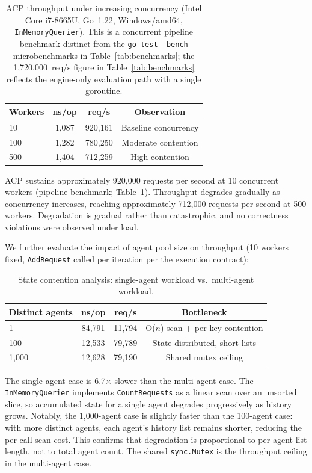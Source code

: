 \documentclass[11pt]{article}
\theoremstyle{definition}
\begin{document}
\begin{table}[h!]
\centering
\small
\begin{tabular}{@{}lccc@{}}
\toprule
\textbf{Workers} & \textbf{ns/op} & \textbf{req/s} & \textbf{Observation} \\
\midrule
10  & 1{,}087 & 920{,}161 & Baseline concurrency \\
100 & 1{,}282 & 780{,}250 & Moderate contention \\
500 & 1{,}404 & 712{,}259 & High contention \\
\bottomrule
\end{tabular}
\caption{ACP throughput under increasing concurrency (Intel Core i7-8665U, Go~1.22, Windows/amd64,
\texttt{InMemoryQuerier}). This is a concurrent pipeline benchmark distinct from the
\texttt{go test -bench} microbenchmarks in Table~\ref{tab:benchmarks}; the 1{,}720{,}000~req/s
figure in Table~\ref{tab:benchmarks} reflects the engine-only evaluation path with a single goroutine.}
\label{tab:throughput}
\end{table}

ACP sustains approximately 920{,}000 requests per second at 10 concurrent workers
(pipeline benchmark; Table~\ref{tab:throughput}).
Throughput degrades gradually as concurrency increases, reaching approximately
712{,}000 requests per second at 500 workers.
Degradation is gradual rather than catastrophic, and no correctness violations were observed under load.

We further evaluate the impact of agent pool size on throughput (10 workers fixed,
\texttt{AddRequest} called per iteration per the execution contract):

\begin{table}[h!]
\centering
\small
\begin{tabular}{@{}lccc@{}}
\toprule
\textbf{Distinct agents} & \textbf{ns/op} & \textbf{req/s} & \textbf{Bottleneck} \\
\midrule
1     & 84{,}791 & 11{,}794 & O($n$) scan + per-key contention \\
100   & 12{,}533 & 79{,}789 & State distributed, short lists \\
1{,}000 & 12{,}628 & 79{,}190 & Shared mutex ceiling \\
\bottomrule
\end{tabular}
\caption{State contention analysis: single-agent workload vs.\ multi-agent workload.}
\label{tab:contention}
\end{table}

The single-agent case is 6.7$\times$ slower than the multi-agent case.
The \texttt{InMemoryQuerier} implements \texttt{CountRequests} as a linear scan over an unsorted
slice, so accumulated state for a single agent degrades progressively as history grows.
Notably, the 1{,}000-agent case is slightly faster than the 100-agent case: with more distinct
agents, each agent's history list remains shorter, reducing the per-call scan cost.
This confirms that degradation is proportional to per-agent list length, not to total agent count.
The shared \texttt{sync.Mutex} is the throughput ceiling in the multi-agent case.
\end{document}
